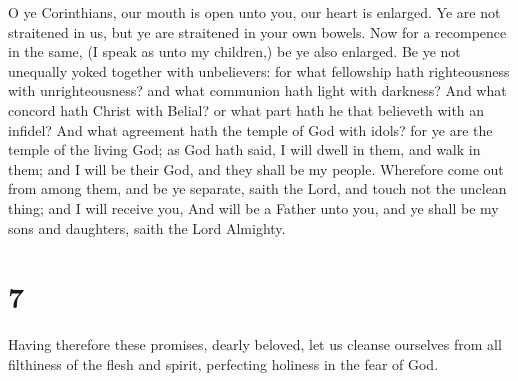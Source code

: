  O ye Corinthians, our mouth is open unto you, our heart is
enlarged.  Ye are not straitened in us, but ye are
straitened in your own bowels.  Now for a recompence in the
same, (I speak as unto my children,) be ye also enlarged. 
Be ye not unequally yoked together with unbelievers: for what fellowship
hath righteousness with unrighteousness? and what communion hath light
with darkness?  And what concord hath Christ with Belial?
or what part hath he that believeth with an infidel?  And
what agreement hath the temple of God with idols? for ye are the temple
of the living God; as God hath said, I will dwell in them, and walk in
them; and I will be their God, and they shall be my people.
 Wherefore come out from among them, and be ye separate,
saith the Lord, and touch not the unclean thing; and I will receive you,
 And will be a Father unto you, and ye shall be my sons and
daughters, saith the Lord Almighty.

\hypertarget{section-6}{%
\section{7}\label{section-6}}

 Having therefore these promises, dearly beloved, let us
cleanse ourselves from all filthiness of the flesh and spirit,
perfecting holiness in the fear of God.

